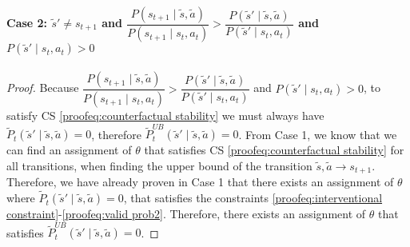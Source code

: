 \paragraph{Case 2: $\tilde{s}' \neq s_{t+1}$ and $\dfrac{P(s_{t+1} \mid \tilde{s}, \tilde{a})}{P(s_{t+1} \mid s_t, a_t)}>\dfrac{P(\tilde{s}' \mid \tilde{s}, \tilde{a})}{P(\tilde{s}' \mid s_t, a_t)}$ and $P(\tilde{s}' \mid s_t, a_t) > 0$}
\noindent
\begin{proof}
Because $\dfrac{P(s_{t+1} \mid \tilde{s}, \tilde{a})}{P(s_{t+1} \mid s_t, a_t)}>\dfrac{P(\tilde{s}' \mid \tilde{s}, \tilde{a})}{P(\tilde{s}' \mid s_t, a_t)}$ and $P(\tilde{s}' \mid s_t, a_t) > 0$, to satisfy CS \eqref{proofeq:counterfactual stability} we must always have $\tilde{P}_{t}(\tilde{s}' \mid \tilde{s}, \tilde{a}) = 0$, therefore $\tilde{P}_{t}^{UB}(\tilde{s}' \mid \tilde{s}, \tilde{a}) = 0$. From Case 1, we know that we can find an assignment of $\theta$ that satisfies CS \eqref{proofeq:counterfactual stability} for all transitions, when finding the upper bound of the transition $\tilde{s}, \tilde{a} \rightarrow s_{t+1}$. Therefore, we have already proven in Case 1 that there exists an assignment of $\theta$ where $\tilde{P}_{t}(\tilde{s}' \mid \tilde{s}, \tilde{a}) = 0$, that satisfies the constraints \eqref{proofeq:interventional constraint}-\eqref{proofeq:valid prob2}. Therefore, there exists an assignment of $\theta$ that satisfies $\tilde{P}_{t}^{UB}(\tilde{s}' \mid \tilde{s}, \tilde{a}) = 0$.
\end{proof}